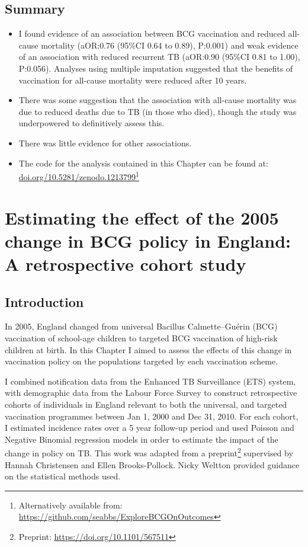 \documentclass[11pt,twoside]{bristolthesis}
\begin{document}
  \hypertarget{summary-5}{%
  \section{Summary}\label{summary-5}}
  \begin{itemize}
  \item
    I found evidence of an association between BCG vaccination and reduced all-cause mortality (aOR:0.76 (95\%CI 0.64 to 0.89), P:0.001) and weak evidence of an association with reduced recurrent TB (aOR:0.90 (95\%CI 0.81 to 1.00), P:0.056). Analyses using multiple imputation suggested that the benefits of vaccination for all-cause mortality were reduced after 10 years.
  \item
    There was some suggestion that the association with all-cause mortality was due to reduced deaths due to TB (in those who died), though the study was underpowered to definitively assess this.
  \item
    There was little evidence for other associations.
  \item
    The code for the analysis contained in this Chapter can be found at: \url{doi.org/10.5281/zenodo.1213799}\footnote{Alternatively available from: \url{https://github.com/seabbs/ExploreBCGOnOutcomes}}
  \end{itemize}
  \hypertarget{direct-eff}{%
  \chapter{Estimating the effect of the 2005 change in BCG policy in England: A retrospective cohort study}\label{direct-eff}}
  
  \hypertarget{introduction-5}{%
  \section{Introduction}\label{introduction-5}}
  
  In 2005, England changed from universal Bacillus Calmette--Guérin (BCG) vaccination of school-age children to targeted BCG vaccination of high-risk children at birth. In this Chapter I aimed to assess the effects of this change in vaccination policy on the populations targeted by each vaccination scheme.
  
  I combined notification data from the Enhanced TB Surveillance (ETS) system, with demographic data from the Labour Force Survey to construct retrospective cohorts of individuals in England relevant to both the universal, and targeted vaccination programmes between Jan 1, 2000 and Dec 31, 2010. For each cohort, I estimated incidence rates over a 5 year follow-up period and used Poisson and Negative Binomial regression models in order to estimate the impact of the change in policy on TB. This work was adapted from a preprint\footnote{Preprint: \url{https://doi.org/10.1101/567511}} supervised by Hannah Christensen and Ellen Brooks-Pollock. Nicky Weltton provided guidance on the statistical methods used.
  
\end{document}
